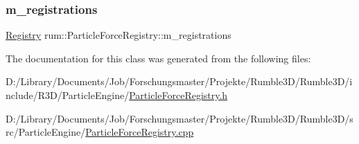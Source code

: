 \subsubsection{\texorpdfstring{m\+\_\+registrations}{m\_registrations}}
{\footnotesize\ttfamily \mbox{\hyperlink{classrum_1_1_particle_force_registry_a63b7b5a4c79dafe5b3658505c7ac1163}{Registry}} rum\+::\+Particle\+Force\+Registry\+::m\+\_\+registrations\hspace{0.3cm}{\ttfamily [protected]}}



The documentation for this class was generated from the following files\+:\begin{DoxyCompactItemize}
\item 
D\+:/\+Library/\+Documents/\+Job/\+Forschungsmaster/\+Projekte/\+Rumble3\+D/\+Rumble3\+D/include/\+R3\+D/\+Particle\+Engine/\mbox{\hyperlink{_particle_force_registry_8h}{Particle\+Force\+Registry.\+h}}\item 
D\+:/\+Library/\+Documents/\+Job/\+Forschungsmaster/\+Projekte/\+Rumble3\+D/\+Rumble3\+D/src/\+Particle\+Engine/\mbox{\hyperlink{_particle_force_registry_8cpp}{Particle\+Force\+Registry.\+cpp}}\end{DoxyCompactItemize}
